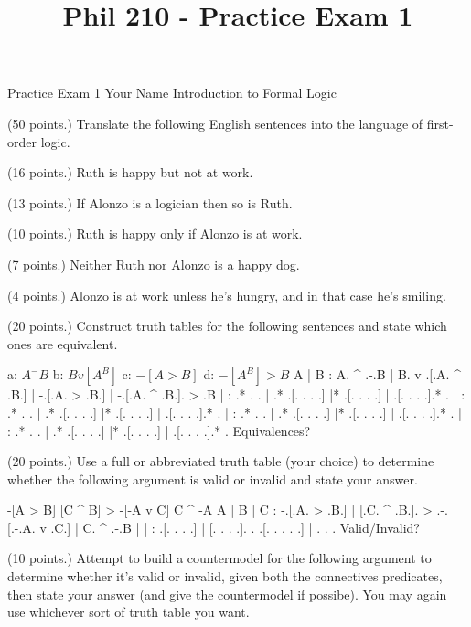
\title{Phil 210 - Practice Exam 1}

\heading
Practice Exam 1
Your Name
Introduction to Formal Logic
\endheading

(50 points.) Translate the following English sentences into the language of first-order logic.

\problems
{} (16 points.)
Ruth is happy but not at work.
	\answer
	$ $
	\endanswer

 (13 points.)
If Alonzo is a logician then so is Ruth.
	\answer
	$ $
	\endanswer

 (10 points.)
Ruth is happy only if Alonzo is at work.
	\answer
	$ $
	\endanswer

 (7 points.)
Neither Ruth nor Alonzo is a happy dog.
	\answer
	$ $
	\endanswer

 (4 points.)
Alonzo is at work unless he's hungry, and in that case he's smiling.
	\answer
	$ $
	\endanswer

\endproblems

(20 points.) Construct truth tables for the following sentences and state which ones are equivalent.

\problems
{}
\list
a: $ A ^ -B $
b: $ B v [A ^ B] $
c: $ -[A > B] $
d: $ -[A ^ B] > B $
\endlist
	\answer
	\truthtable
	 A | B : A. ^ .-.B | B. v .[.A. ^ .B.] | -.[.A. > .B.] | -.[.A. ^ .B.]. > .B
	\truthtableline
	   |   :  .*  . .  |  .*  .[. .   . .] |* .[. .   . .] |  .[. .   . .].*  . 
	   |   :  .*  . .  |  .*  .[. .   . .] |* .[. .   . .] |  .[. .   . .].*  . 
	   |   :  .*  . .  |  .*  .[. .   . .] |* .[. .   . .] |  .[. .   . .].*  . 
	   |   :  .*  . .  |  .*  .[. .   . .] |* .[. .   . .] |  .[. .   . .].*  . 
	\endtruthtable
	Equivalences?
	\endanswer

\endproblems

(20 points.) Use a full or abbreviated truth table (your choice) to determine whether the following argument is valid or invalid and state your answer.

\problems
{}
\argument
 -[A > B]
 [C ^ B] > -[-A v C]
\argumentline
 C ^ -A
\endargument
	\answer
	\truthtable
	 A | B | C : -.[.A. > .B.] | [.C. ^ .B.]. > .-.[.-.A. v .C.] | C. ^ .-.B
	\truthtableline
	   |   |   :  .[. .   . .] | [. .   . .].   . .[. . .   . .] |  .   . . 
	\endtruthtable
	Valid/Invalid?
	\endanswer

\endproblems

(10 points.) Attempt to build a countermodel for the following argument to determine whether it's valid or invalid, given both the connectives predicates, then state your answer (and give the countermodel if possibe). You may again use whichever sort of truth table you want.

